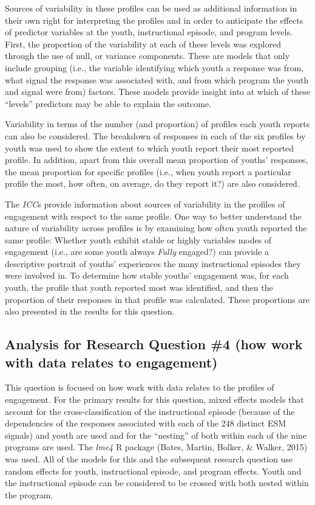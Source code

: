\documentclass[]{book}
\theoremstyle{definition}
\theoremstyle{definition}
\theoremstyle{definition}
\theoremstyle{remark}
\begin{document}
Sources of variability in these profiles can be used as additional
information in their own right for interpreting the profiles and in
order to anticipate the effects of predictor variables at the youth,
instructional episode, and program levels. First, the proportion of the
variability at each of these levels was explored through the use of
null, or variance components. These are models that only include
grouping (i.e., the variable identifying which youth a response was
from, what signal the response was associated with, and from which
program the youth and signal were from) factors. These models provide
insight into at which of these ``levels'' predictors may be able to
explain the outcome.

Variability in terms of the number (and proportion) of profiles each
youth reports can also be considered. The breakdown of responses in each
of the six profiles by youth was used to show the extent to which youth
report their most reported profile. In addition, apart from this overall
mean proportion of youths' responses, the mean proportion for specific
profiles (i.e., when youth report a particular profile the most, how
often, on average, do they report it?) are also considered.

The \emph{ICC}s provide information about sources of variability in the
profiles of engagement with respect to the same profile. One way to
better understand the nature of variability across profiles is by
examining how often youth reported the same profile: Whether youth
exhibit stable or highly variables modes of engagement (i.e., are some
youth always \emph{Fully} engaged?) can provide a descriptive portrait
of youths' experiences the many instructional episodes they were
involved in. To determine how stable youths' engagement was, for each
youth, the profile that youth reported most was identified, and then the
proportion of their responses in that profile was calculated. These
proportions are also presented in the results for this question.

\subsection{Analysis for Research Question \#4 (how work with data
relates to
engagement)}\label{analysis-for-research-question-4-how-work-with-data-relates-to-engagement}

This question is focused on how work with data relates to the profiles
of engagement. For the primary results for this question, mixed effects
models that account for the cross-classification of the instructional
episode (because of the dependencies of the responses associated with
each of the 248 distinct ESM signals) and youth are used and for the
``nesting'' of both within each of the nine programs are used. The
\emph{lme4} R package (Bates, Martin, Bolker, \& Walker, 2015) was used.
All of the models for this and the subsequent research question use
random effects for youth, instructional episode, and program effects.
Youth and the instructional episode can be considered to be crossed with
both nested within the program.
\end{document}
